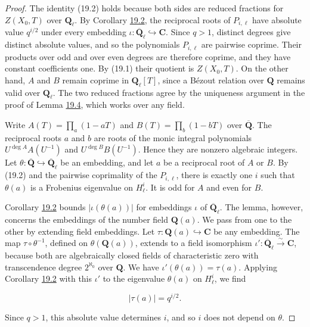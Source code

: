 \documentclass[11pt]{article}
\begin{document}
\begin{proof}[{Proof}]\label{bp341}%
The identity (19.2) holds because both sides are reduced fractions for \(Z(X_0,T)\) over \(\mathbf Q_\ell\). By Corollary \hyperref[bp326]{19.2}, the reciprocal roots of \(P_{i,\ell}\) have absolute value \(q^{i/2}\) under every embedding \(\iota:\overline{\mathbf Q}_\ell\hookrightarrow\mathbf C\). Since \(q>1\), distinct degrees give distinct absolute values, and so the polynomials \(P_{i,\ell}\) are pairwise coprime. Their products over odd and over even degrees are therefore coprime, and they have constant coefficients one. By (19.1) their quotient is \(Z(X_0,T)\). On the other hand, \(A\) and \(B\) remain coprime in \(\mathbf Q_\ell[T]\), since a Bézout relation over \(\mathbf Q\) remains valid over \(\mathbf Q_\ell\). The two reduced fractions agree by the uniqueness argument in the proof of Lemma \hyperref[bp333]{19.4}, which works over any field.

Write \(A(T)=\prod_a(1-aT)\) and \(B(T)=\prod_b(1-bT)\) over \(\overline{\mathbf Q}\). The reciprocal roots \(a\) and \(b\) are roots of the monic integral polynomials \(U^{\deg A}A(U^{-1})\) and \(U^{\deg B}B(U^{-1})\). Hence they are nonzero algebraic integers. Let \(\theta:\overline{\mathbf Q}\hookrightarrow\overline{\mathbf Q}_\ell\) be an embedding, and let \(a\) be a reciprocal root of \(A\) or \(B\). By (19.2) and the pairwise coprimality of the \(P_{i,\ell}\), there is exactly one \(i\) such that \(\theta(a)\) is a Frobenius eigenvalue on \(H^i_\ell\). It is odd for \(A\) and even for \(B\).

Corollary \hyperref[bp326]{19.2} bounds \(|\iota(\theta(a))|\) for embeddings \(\iota\) of \(\overline{\mathbf Q}_\ell\). The lemma, however, concerns the embeddings of the number field \(\mathbf Q(a)\). We pass from one to the other by extending field embeddings. Let \(\tau:\mathbf Q(a)\hookrightarrow\mathbf C\) be any embedding. The map \(\tau\circ\theta^{-1}\), defined on \(\theta(\mathbf Q(a))\), extends to a field isomorphism \(\iota':\overline{\mathbf Q}_\ell\xrightarrow{\sim}\mathbf C\), because both are algebraically closed fields of characteristic zero with transcendence degree \(2^{\aleph_0}\) over \(\mathbf Q\). We have \(\iota'(\theta(a))=\tau(a)\). Applying Corollary \hyperref[bp326]{19.2} with this \(\iota'\) to the eigenvalue \(\theta(a)\) on \(H^i_\ell\), we find

\[
|\tau(a)|=q^{i/2}.
\]

Since \(q>1\), this absolute value determines \(i\), and so \(i\) does not depend on \(\theta\).
\end{proof}
\end{document}
